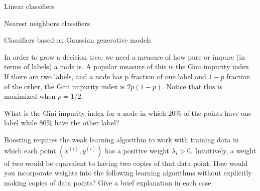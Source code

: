 \documentclass{article}
\begin{document}
\begin{probset}
\begin{prob}
    \begin{subprobset}
    \begin{subprob}
        Linear classifiers

        \begin{soln}

        \end{soln}
    \end{subprob}

    \begin{subprob}
        Nearest neighbors classifiers

        \begin{soln}

        \end{soln}
    \end{subprob}

    \begin{subprob}
        Classifiers based on Gaussian generative models

        \begin{soln}

        \end{soln}
    \end{subprob}
    \end{subprobset}
\end{prob}

\begin{prob}
    In order to grow a decision tree, we need a measure of how pure or impure (in terms of labels) a node is. A popular measure of this is the Gini impurity index. If there are two labels, and a node has p fraction of one label and $1 - p$ fraction of the other, the Gini impurity index is $2p(1 - p)$. Notice that this is maximized when $p = 1/2$.

    What is the Gini impurity index for a node in which 20\% of the points have one label while 80\% have the other label?

    \begin{soln}

    \end{soln}
\end{prob}

\begin{prob}
    Boosting requires the weak learning algorithm to work with training data in which each point $(x^{(i)}, y^{(i)})$ has a positive weight $\lambda_i > 0$. Intuitively, a weight of two would be equivalent to having two copies of that data point. How would you incorporate weights into the following learning algorithms without explicitly making copies of data points? Give a brief explanation in each case.


\end{prob}
\end{probset}
\end{document}
